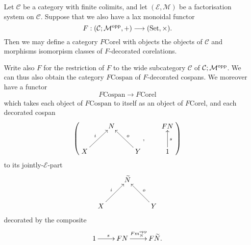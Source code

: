   


\begin{corollary}
  Let $\mathcal C$ be a category with finite colimits, and let $(\mathcal E,
  \mathcal M)$ be a factorisation system on $\mathcal C$. Suppose that we also
  have a lax monoidal functor
  \[
    F: (\mathcal C;\mathcal M^{\mathrm{opp}},+) \longrightarrow (\mathrm{Set}, \times).
  \]
  Then we may define a category $F\mathrm{Corel}$ with objects the objects of
  $\mathcal C$ and morphisms isomorpism classes of $F$-decorated corelations.

  Write also $F$ for the restriction of $F$ to the wide subcategory $\mathcal
  C$ of $\mathcal C;\mathcal M^{\mathrm{opp}}$. We can thus also obtain the category
  $F\mathrm{Cospan}$ of
  $F$-decorated cospans. We moreover have a functor 
  \[
    F\mathrm{Cospan} \to F\mathrm{Corel}
  \]
  which takes each object of $F\mathrm{Cospan}$ to itself as an object of
  $F\mathrm{Corel}$, and each decorated cospan
  \[
    \left(
    \begin{aligned}
      \xymatrix{
	& N \\  
	X \ar[ur]^{i} && Y \ar[ul]_{o}
      }
    \end{aligned}
    ,
    \qquad
    \begin{aligned}
      \xymatrix{
	FN \\
	1 \ar[u]_{s}
      }
    \end{aligned}
    \right)
  \]  
  to its jointly-$\mathcal E$-part
  \[
    \xymatrix{
      & \widetilde{N} \\  
      X \ar[ur]^{i} && Y \ar[ul]_{o}
    }
  \]
  decorated by the composite
  \[
    \xymatrix{
      1 \ar[r]^s & FN \ar[r]^{Fm_N^\opp} & F\widetilde{N}.
    }
  \]
\end{corollary}


